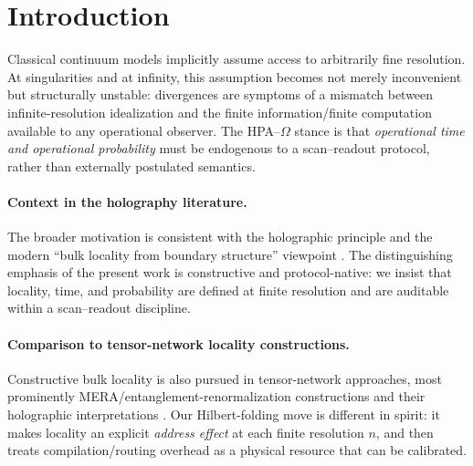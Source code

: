 
\section{Introduction}
\label{sec:introduction}

Classical continuum models implicitly assume access to arbitrarily fine resolution.
At singularities and at infinity, this assumption becomes not merely inconvenient but structurally unstable: divergences are symptoms of a mismatch between infinite-resolution idealization and the finite information/finite computation available to any operational observer.
The HPA--$\Omega$ stance is that \emph{operational time and operational probability} must be endogenous to a scan--readout protocol, rather than externally postulated semantics.

\paragraph{Context in the holography literature.}
The broader motivation is consistent with the holographic principle and the modern ``bulk locality from boundary structure'' viewpoint \cite{tHooft1993,Susskind1995,Bousso2002,AlmheiriDongHarlow2015,Pastawski2015,Harlow2017}.
The distinguishing emphasis of the present work is constructive and protocol-native: we insist that locality, time, and probability are defined at finite resolution and are auditable within a scan--readout discipline.

\paragraph{Comparison to tensor-network locality constructions.}
Constructive bulk locality is also pursued in tensor-network approaches, most prominently MERA/entanglement-renormalization constructions and their holographic interpretations \cite{EvenblyVidal2009,Swingle2009}.
Our Hilbert-folding move is different in spirit: it makes locality an explicit \emph{address effect} at each finite resolution $n$, and then treats compilation/routing overhead as a physical resource that can be calibrated.

